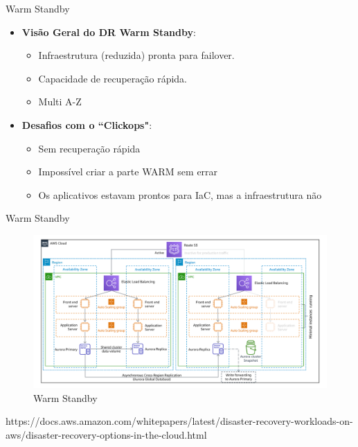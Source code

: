 \documentclass[aspectratio=169]{beamer}
\begin{document}
\begin{frame}{Warm Standby}
	\begin{itemize}
		\item \textbf{Visão Geral do DR Warm Standby}:
		\begin{itemize}
			\item Infraestrutura (reduzida) pronta para failover.
			\item Capacidade de recuperação rápida.
			\item Multi A-Z
		\end{itemize}
				\item \textbf{Desafios com o ``Clickops"}:
		\begin{itemize}
			\item Sem recuperação rápida
			\item Impossível criar a parte WARM sem errar
			\item Os aplicativos estavam prontos para IaC, mas a infraestrutura não
		\end{itemize}
	\end{itemize}
\end{frame}

\begin{frame}{Warm Standby}
\begin{figure}
	\centering
	\includegraphics[width=0.8\linewidth]{Images/warmsandbyaws}
	\caption{Warm Standby}
	\label{fig:warmsandbyaws}
\end{figure}
https://docs.aws.amazon.com/whitepapers/latest/disaster-recovery-workloads-on-aws/disaster-recovery-options-in-the-cloud.html
\end{frame}
\end{document}
